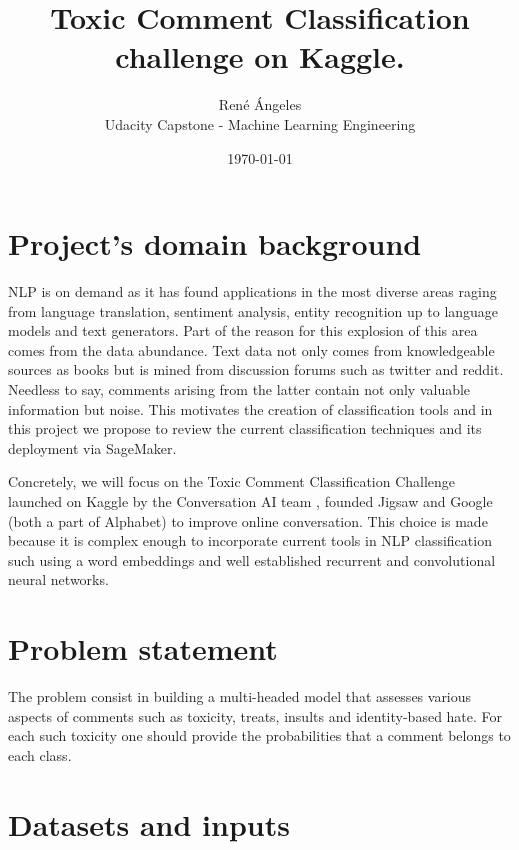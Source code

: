 \documentclass[book,preprintnumbers,11pt]{article}
\begin{document}
\title{Toxic Comment Classification challenge on Kaggle.}
\author{Ren\'e  \'Angeles\\
  Udacity Capstone - Machine Learning Engineering \\
  }
\date{\today}
\maketitle




\section{Project's domain background}

NLP is on demand as it has found applications in the most diverse 
areas raging from language translation, sentiment analysis, entity recognition up to language models and text
generators.  Part of the reason for this explosion of this area 
comes from the data abundance. Text data not only comes from 
knowledgeable  sources as books but is mined from discussion forums such as
twitter and reddit. Needless to say,  comments arising from the latter contain 
not only valuable information but noise. This motivates the creation of 
classification tools and in this project we propose to review the
current classification techniques and its deployment via SageMaker. 

Concretely, we will focus on the Toxic Comment Classification Challenge launched
on Kaggle by the Conversation AI team  \cite{kaggle}, founded Jigsaw and Google (both a part of Alphabet) 
to improve online conversation. This choice is made because 
it is complex enough to incorporate current tools in NLP classification 
such using a word embeddings and well established recurrent and convolutional neural networks. 


\section{Problem statement}

The problem consist in building a multi-headed model that assesses various aspects of comments 
such as  toxicity, treats, insults and identity-based hate. For each such toxicity one should 
provide the probabilities that a comment belongs to each class. 

\section{Datasets and inputs}
\end{document}
